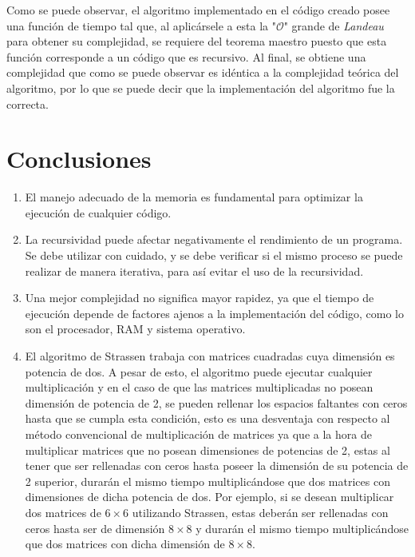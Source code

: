 \documentclass[12pt,letterpaper]{article}
\begin{document}
Como se puede observar, el algoritmo implementado en el código creado posee una función de tiempo tal que, al aplicársele a esta la "$\mathcal{O}$" grande de \textit{Landeau} para obtener su complejidad, se requiere del teorema maestro puesto que esta función corresponde a un código que es recursivo. Al final, se obtiene una complejidad que como se puede observar es idéntica a la complejidad teórica del algoritmo, por lo que se puede decir que la implementación del algoritmo fue la correcta. 


\section{Conclusiones}
\begin{enumerate}
\item El manejo adecuado de la memoria es fundamental para optimizar la ejecución de cualquier código.
\item La recursividad puede afectar negativamente el rendimiento de un programa. Se debe utilizar con cuidado, y se debe verificar si el mismo proceso se puede realizar de manera iterativa, para así evitar el uso de la recursividad.
\item Una mejor complejidad no significa mayor rapidez, ya que el tiempo de ejecución depende de factores ajenos a la implementación del código, como lo son el procesador, RAM y sistema operativo.
\item El algoritmo de Strassen trabaja con matrices cuadradas cuya dimensión es potencia de dos. A pesar de esto, el algoritmo puede ejecutar cualquier multiplicación y en el caso de que las matrices multiplicadas no posean dimensión de potencia de 2, se pueden rellenar los espacios faltantes con ceros hasta que se cumpla esta condición, esto es una desventaja con respecto al método convencional de multiplicación de matrices ya que a la hora de multiplicar matrices que no posean dimensiones de potencias de 2, estas al tener que ser rellenadas con ceros hasta poseer la dimensión de su potencia de 2 superior, durarán el mismo tiempo multiplicándose que dos matrices con dimensiones de dicha potencia de dos. Por ejemplo, si se desean multiplicar dos matrices de $6\times 6$ utilizando Strassen, estas deberán ser rellenadas con ceros hasta ser de dimensión $8 \times 8$ y durarán el mismo tiempo multiplicándose que dos matrices con dicha dimensión de $8 \times 8$.
\end{enumerate}
\end{document}
